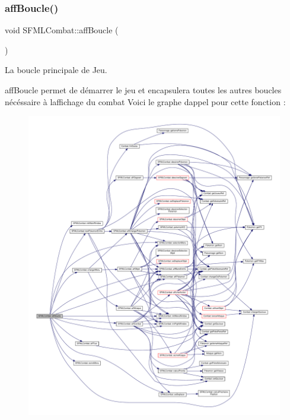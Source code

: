 \subsubsection{\texorpdfstring{aff\+Boucle()}{affBoucle()}}
{\footnotesize\ttfamily void S\+F\+M\+L\+Combat\+::aff\+Boucle (\begin{DoxyParamCaption}{ }\end{DoxyParamCaption})}



La boucle principale de Jeu. 

aff\+Boucle permet de démarrer le jeu et encapsulera toutes les autres boucles nécéssaire à l\textquotesingle{}affichage du combat Voici le graphe d\textquotesingle{}appel pour cette fonction \+:\nopagebreak
\begin{figure}[H]
\begin{center}
\leavevmode
\includegraphics[width=350pt]{class_s_f_m_l_combat_a39155235e6275b4d63b9317b9561843e_cgraph}
\end{center}
\end{figure}
\mbox{\label{class_s_f_m_l_combat_a116d70985530e3c46e5b60adc910a1fb}} 
